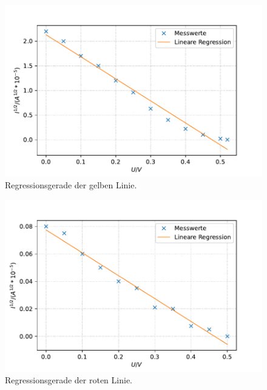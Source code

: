 \begin{figure}
  \center
  \caption{Regressionsgerade der gelben Linie.}\label{fig:spek4}
  \includegraphics[width=0.8\linewidth]{pictures/spek4.pdf}
\end{figure}

\begin{figure}
  \center
  \caption{Regressionsgerade der roten Linie.}\label{fig:spek5}
  \includegraphics[width=0.8\linewidth]{pictures/spek5.pdf}
\end{figure}